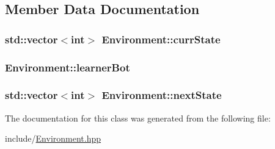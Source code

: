 \subsection{Member Data Documentation}
\subsubsection[{\texorpdfstring{curr\+State}{currState}}]{\setlength{\rightskip}{0pt plus 5cm}std\+::vector$<$int$>$ Environment\+::curr\+State}\hypertarget{classEnvironment_a96b01ffa658eeec4782b40dc852359b0}{}\label{classEnvironment_a96b01ffa658eeec4782b40dc852359b0}
\subsubsection[{\texorpdfstring{learner\+Bot}{learnerBot}}]{ Environment\+::learner\+Bot}\hypertarget{classEnvironment_aebe4ef0e6fcd4dc434bf48fc671e10a5}{}\label{classEnvironment_aebe4ef0e6fcd4dc434bf48fc671e10a5}
\subsubsection[{\texorpdfstring{next\+State}{nextState}}]{\setlength{\rightskip}{0pt plus 5cm}std\+::vector$<$int$>$ Environment\+::next\+State}\hypertarget{classEnvironment_a0a6aadc296ea61bf7890c9f6d486ee12}{}\label{classEnvironment_a0a6aadc296ea61bf7890c9f6d486ee12}


The documentation for this class was generated from the following file\+:\begin{DoxyCompactItemize}
\item 
include/\hyperlink{Environment_8hpp}{Environment.\+hpp}\end{DoxyCompactItemize}
